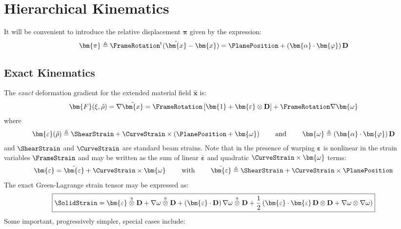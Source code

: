 \section{Hierarchical Kinematics}

It will be convenient to introduce the relative displacement $\bm{\pi}$ given by the expression:
$$
\bm{\pi} \triangleq \FrameRotation^{\mathrm{t}} (\hat{\bm{x}} - \bm{x}) = \PlanePosition  + (\bm{\alpha}\cdot\bm{\varphi})\,\mathbf{D}
$$

\subsection{Exact Kinematics}

The \emph{exact} deformation gradient for the extended material field $\hat{\bm{x}}$ is:
$$
\bm{F}(\xi, \hat{\rho}) = \nabla \hat{\bm{x}} = \FrameRotation\left[\bm{1} + \bm{\varepsilon}\otimes\mathbf{D}\right] + \FrameRotation\nabla \bm{\omega}
$$
where
$$
\bm{\varepsilon}(\hat{\rho}) \triangleq\ShearStrain  + \CurveStrain  \times (\PlanePosition  + \bm{\omega})
\qquad\text{ and }\qquad
\bm{\omega} \triangleq (\bm{\alpha}\cdot\bm{\varphi})\, \mathbf{D}
$$
and $\ShearStrain $ and $\CurveStrain $ are standard beam strains.
Note that in the presence of warping $\bm{\varepsilon}$ is nonlinear in
the strain variables $\FrameStrain$ and may be written as the sum of linear $\bar{\bm{\varepsilon}}$ and quadratic $\CurveStrain \times\bm{\omega}$ terms:
$$
\bm{\varepsilon} = \bar{\bm{\varepsilon}} + \CurveStrain \times\bm{\omega}
\qquad\text{ with }\qquad
\bar{\bm{\varepsilon}} \triangleq \ShearStrain  + \CurveStrain \times\PlanePosition 
$$
%
The exact Green-Lagrange strain tensor may be expressed as:
\begin{equation}
\boxed{
\SolidStrain = \bm{\varepsilon}
\stackrel{\mathrm{s}}{\otimes}
\mathbf{D} 
+\nabla\omega \stackrel{\mathrm{s}}{\otimes} \mathbf{D}
+({\bm{\varepsilon}}\cdot\mathbf{D})\,\nabla\omega \stackrel{\mathrm{s}}{\otimes} \mathbf{D}
+ \frac{1}{2}\left(
  \bm{\varepsilon}\cdot\bm{\varepsilon}\,\mathbf{D}\otimes\mathbf{D}
+ \nabla\omega\otimes\nabla\omega
\right)
}
\end{equation}
%
Some important, progressively simpler, special cases include:
